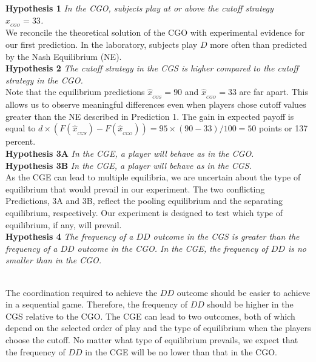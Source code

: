 \documentclass[12pt,english]{article}
\begin{document}
\noindent \textbf{Hypothesis 1}
\textit{In the CGO, subjects play at or above the cutoff strategy $\hat{x}_{_{CGO}}=33$.}\\

We reconcile the theoretical solution of the CGO with experimental evidence for our first prediction. In the laboratory, subjects play $D$ more often than predicted by the Nash Equilibrium (NE). \\

\noindent \textbf{Hypothesis 2}
\textit{The cutoff strategy in the CGS is higher compared to the cutoff strategy in the CGO.}\\

Note that the equilibrium predictions $\hat{x}_{_{CGS}}=90$ and $\hat{x}_{_{CGO}}=33$ are far apart. This allows us to observe meaningful differences even when players chose cutoff values greater than the NE described in Prediction 1. The gain in expected payoff is equal to $d\times \left( F(\hat{x}_{_{CGS}})-F(\hat{x}_{_{CGO}}) \right)=95\times( 90-33)/100=50$ points or 137 percent. \\

\noindent \textbf{Hypothesis 3A} \textit{In the CGE, a player will behave as in the CGO. }\\
\noindent \textbf{Hypothesis 3B} \textit{In the CGE, a player will behave as in the CGS.}\\

As the CGE can lead to multiple equilibria, we are uncertain about the type of equilibrium that would prevail in our experiment. The two conflicting Predictions, 3A and 3B, reflect the pooling equilibrium and the separating equilibrium, respectively. Our experiment is designed to test which type of equilibrium, if any, will prevail. \\

\noindent \textbf{Hypothesis 4}
\textit{The frequency of a $DD$ outcome in the CGS is greater than the frequency of a $DD$ outcome in the CGO. In the CGE, the frequency of $DD$ is no smaller than in the CGO.}

\\


The coordination required to achieve the $DD$ outcome should be easier to achieve in a sequential game. Therefore, the frequency of $DD$ should be higher in the CGS relative to the CGO. The CGE can lead to two outcomes, both of which depend on the selected order of play and the type of equilibrium when the players choose the cutoff. No matter what type of equilibrium prevails, we expect that the frequency of $DD$ in the CGE will be no lower than that in the CGO.   \\
\end{document}
